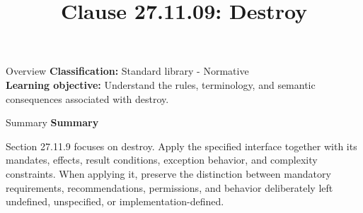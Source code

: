 \documentclass[10pt,letterpaper]{article}
\title{Clause 27.11.09: Destroy}
\author{}
\date{}
\begin{document}
\maketitle
\begin{CornellOverviewBox}{Overview}
\textbf{Classification:} Standard library - Normative\\[2pt]
\textbf{Learning objective:} Understand the rules, terminology, and semantic consequences associated with destroy.
\end{CornellOverviewBox}\begin{CornellSummaryBox}{Summary}
{\sffamily\bfseries\color{Accent} Summary}\par\vspace{3pt}Section 27.11.9 focuses on destroy. Apply the specified interface together with its mandates, effects, result conditions, exception behavior, and complexity constraints. When applying it, preserve the distinction between mandatory requirements, recommendations, permissions, and behavior deliberately left undefined, unspecified, or implementation-defined.
\end{CornellSummaryBox}
\end{document}
